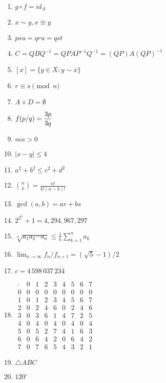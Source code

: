 \documentclass[oneside,10pt,]{article}
\begin{document}
\begin{enumerate}
\item{}\(\displaystyle g \circ f = id_A\)%
\item{}\(\displaystyle x \sim y, x\cong y\)%
\item{}\(\displaystyle psu = qru = qst\)%
\item{}\(\displaystyle C = QBQ^{-1} = QPAP^{-1} Q^{-1} = (QP)A(QP)^{-1}\)%
\item{}\(\displaystyle [x] = \{ y \in X : y \sim x \}\)%
\item{}\(\displaystyle r \equiv s \pmod{ n}\)%
\item{}\(\displaystyle A \times D = \emptyset\)%
\item{}\(\displaystyle \displaystyle f(p/q) = \frac{3p}{3q}\)%
\item{}\(\displaystyle mn > 0\)%
\item{}\(\displaystyle |x - y| \leq 4\)%
\item{}\(\displaystyle a^2 + b^2 \leq c^2 + d^2\)%
\item{}\(\displaystyle \binom{n}{k} = \frac{n!}{k! (n - k)!}\)%
\item{}\(\displaystyle \gcd( a, b) = ar + bs\)%
\item{}\(\displaystyle 2^{2^5} + 1 = 4{,}294{,}967{,}297\)%
\item{}\(\displaystyle \sqrt[n]{a_1 a_2 \cdots a_n} \leq \frac{1}{n} \sum_{k = 1}^{n} a_k\)%
\item{}\(\displaystyle \lim_{n \rightarrow \infty} f_n / f_{n + 1} = (\sqrt{5} - 1)/2\)%
\item{}\(\displaystyle c=4\,598\,037\,234\)%
\item{}\(\displaystyle \begin{array}{c|cccccccc} \cdot & 0 & 1 & 2 & 3 & 4 & 5 & 6 & 7 \\ \hline 0 & 0 & 0 & 0 & 0 & 0 & 0 & 0 & 0 \\ 1 & 0 & 1 & 2 & 3 & 4 & 5 & 6 & 7 \\ 2 & 0 & 2 & 4 & 6 & 0 & 2 & 4 & 6 \\ 3 & 0 & 3 & 6 & 1 & 4 & 7 & 2 & 5 \\ 4 & 0 & 4 & 0 & 4 & 0 & 4 & 0 & 4 \\ 5 & 0 & 5 & 2 & 7 & 4 & 1 & 6 & 3 \\ 6 & 0 & 6 & 4 & 2 & 0 & 6 & 4 & 2 \\ 7 & 0 & 7 & 6 & 5 & 4 & 3 & 2 & 1 \end{array}\)%
\item{}\(\displaystyle \bigtriangleup ABC\)%
\item{}\(\displaystyle 120^{\circ}\)%

\end{enumerate}
\end{document}
